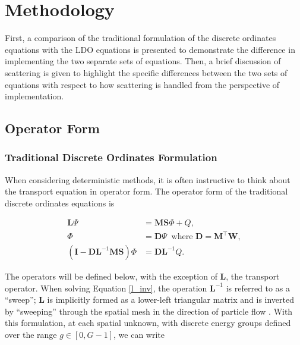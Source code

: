 \documentclass{article} %
\newcommand{\ve}[1]{\ensuremath{\mathbf{#1}}}
\begin{document}
\section{Methodology}

First, a comparison of the traditional formulation of the discrete ordinates
equations with the LDO equations is presented to demonstrate the difference 
in implementing the two separate sets of equations. Then, a brief discussion of 
scattering is given to highlight the specific differences between the two sets
of equations with respect to how scattering is handled from the perspective of 
implementation.

\subsection{Operator Form}
\subsubsection{Traditional Discrete Ordinates Formulation}

When considering deterministic methods, it is often instructive to think about
the transport equation in operator form. The 
operator form of the traditional discrete ordinates equations is

\begin{align}
\ve{L}\Psi &= \ve{MS}\Phi + Q, \\
\Phi &= \ve{D}\Psi\: \text{ where } \ve{D} = \ve{M}^\top\ve{W}, \\
\left(\ve{I} - \ve{DL}^{-1}\ve{MS}\right)\Phi &= \ve{DL}^{-1}Q.
\label{l_inv}
\end{align}

\noindent The operators will be defined below, with the exception of $\ve{L}$,
the transport operator. When solving Equation \ref{l_inv}, the operation
$\ve{L}^{-1}$ is referred to as a ``sweep''; $\ve{L}$ is implicitly formed as a
lower-left triangular matrix and is inverted by ``sweeping'' through the
spatial mesh in the direction of particle flow \cite{exmm}.
With this formulation, at each spatial unknown, with discrete energy groups
defined over the range $g\in[0,G-1]$, we can write
\end{document}
